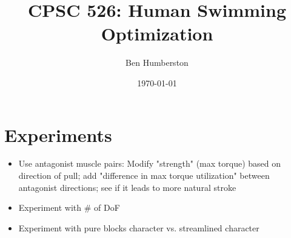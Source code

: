 \documentclass{acmtog}
\begin{document}
\title{CPSC 526: Human Swimming Optimization}
\author{Ben Humberston}
\date{\today}
\maketitle

\pagestyle{empty}

\section{Experiments}

\begin{itemize}
\item Use antagonist muscle pairs: Modify "strength" (max torque) based on direction of pull; add "difference in max torque utilization" between antagonist directions; see if it leads to more natural stroke
\item Experiment with \# of DoF
\item Experiment with pure blocks character vs. streamlined character
\end{itemize}




\end{document}
